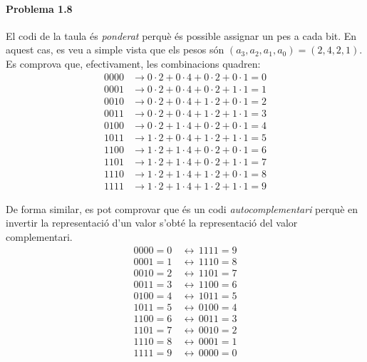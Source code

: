 \documentclass[catalan,border=15pt,class=scrartcl,multi=minipage]{standalone}
\begin{document}
\begin{minipage}{30em}

\paragraph{Problema 1.8}

El codi de la taula és \emph{ponderat} perquè és possible assignar un pes a cada bit.
En aquest cas, es veu a simple vista que els pesos són $\left(a_3, a_2, a_1, a_0\right) = \left(2, 4, 2, 1\right)$.
Es comprova que, efectivament, les combinacions quadren:
%
\begin{align*}
  0000 &\rightarrow 0 \cdot 2 + 0 \cdot 4 + 0 \cdot 2 + 0 \cdot 1 = 0 \\
  0001 &\rightarrow 0 \cdot 2 + 0 \cdot 4 + 0 \cdot 2 + 1 \cdot 1 = 1 \\
  0010 &\rightarrow 0 \cdot 2 + 0 \cdot 4 + 1 \cdot 2 + 0 \cdot 1 = 2 \\
  0011 &\rightarrow 0 \cdot 2 + 0 \cdot 4 + 1 \cdot 2 + 1 \cdot 1 = 3 \\
  0100 &\rightarrow 0 \cdot 2 + 1 \cdot 4 + 0 \cdot 2 + 0 \cdot 1 = 4 \\
  1011 &\rightarrow 1 \cdot 2 + 0 \cdot 4 + 1 \cdot 2 + 1 \cdot 1 = 5 \\
  1100 &\rightarrow 1 \cdot 2 + 1 \cdot 4 + 0 \cdot 2 + 0 \cdot 1 = 6 \\
  1101 &\rightarrow 1 \cdot 2 + 1 \cdot 4 + 0 \cdot 2 + 1 \cdot 1 = 7 \\
  1110 &\rightarrow 1 \cdot 2 + 1 \cdot 4 + 1 \cdot 2 + 0 \cdot 1 = 8 \\
  1111 &\rightarrow 1 \cdot 2 + 1 \cdot 4 + 1 \cdot 2 + 1 \cdot 1 = 9
\end{align*}

De forma similar, es pot comprovar que és un codi \emph{autocomplementari} perquè
en invertir la representació d'un valor s'obté la representació del valor complementari.
%
\begin{align*}
  0000 = 0 \, &\leftrightarrow \, 1111 = 9 \\
  0001 = 1 \, &\leftrightarrow \, 1110 = 8 \\
  0010 = 2 \, &\leftrightarrow \, 1101 = 7 \\
  0011 = 3 \, &\leftrightarrow \, 1100 = 6 \\
  0100 = 4 \, &\leftrightarrow \, 1011 = 5 \\
  1011 = 5 \, &\leftrightarrow \, 0100 = 4 \\
  1100 = 6 \, &\leftrightarrow \, 0011 = 3 \\
  1101 = 7 \, &\leftrightarrow \, 0010 = 2 \\
  1110 = 8 \, &\leftrightarrow \, 0001 = 1 \\
  1111 = 9 \, &\leftrightarrow \, 0000 = 0
\end{align*}

\end{minipage}
\end{document}
